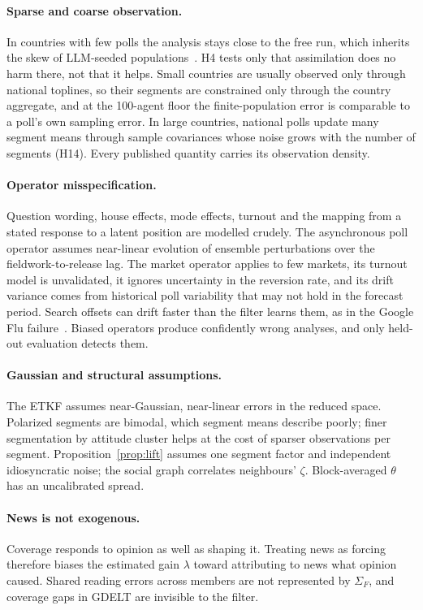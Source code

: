 \documentclass[10pt]{article}
\theoremstyle{remark}
\begin{document}
\paragraph{Sparse and coarse observation.} In countries with few polls the analysis stays close to the free run, which inherits the skew of LLM-seeded populations~\cite{durmus2023,tao2024}. H4 tests only that assimilation does no harm there, not that it helps. Small countries are usually observed only through national toplines, so their segments are constrained only through the country aggregate, and at the 100-agent floor the finite-population error is comparable to a poll's own sampling error. In large countries, national polls update many segment means through sample covariances whose noise grows with the number of segments (H14). Every published quantity carries its observation density.

\paragraph{Operator misspecification.} Question wording, house effects, mode effects, turnout and the mapping from a stated response to a latent position are modelled crudely. The asynchronous poll operator assumes near-linear evolution of ensemble perturbations over the fieldwork-to-release lag. The market operator applies to few markets, its turnout model is unvalidated, it ignores uncertainty in the reversion rate, and its drift variance comes from historical poll variability that may not hold in the forecast period. Search offsets can drift faster than the filter learns them, as in the Google Flu failure~\cite{lazer2014}. Biased operators produce confidently wrong analyses, and only held-out evaluation detects them.

\paragraph{Gaussian and structural assumptions.} The ETKF assumes near-Gaussian, near-linear errors in the reduced space. Polarized segments are bimodal, which segment means describe poorly; finer segmentation by attitude cluster helps at the cost of sparser observations per segment. Proposition~\ref{prop:lift} assumes one segment factor and independent idiosyncratic noise; the social graph correlates neighbours' $\zeta$. Block-averaged $\theta$ has an uncalibrated spread.

\paragraph{News is not exogenous.} Coverage responds to opinion as well as shaping it. Treating news as forcing therefore biases the estimated gain $\lambda$ toward attributing to news what opinion caused. Shared reading errors across members are not represented by $\Sigma_F$, and coverage gaps in GDELT are invisible to the filter.
\end{document}

